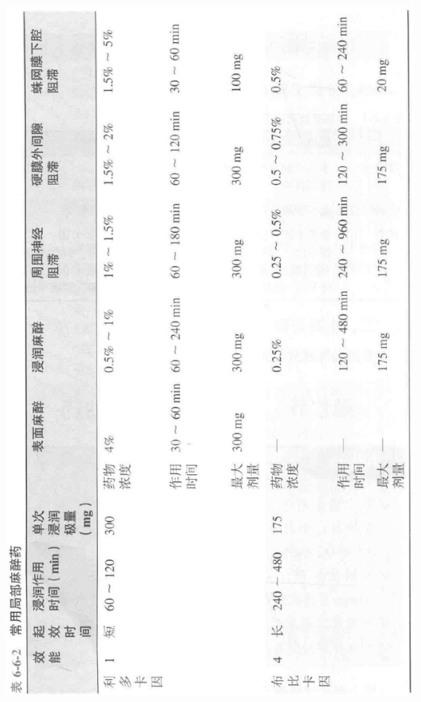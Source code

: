 \documentclass[10pt]{article}
\begin{document}
\begin{center}
\includegraphics[max width=\textwidth]{2024_07_05_645bb794a4d4f32ee0c8g-340}
\end{center}
\end{document}
